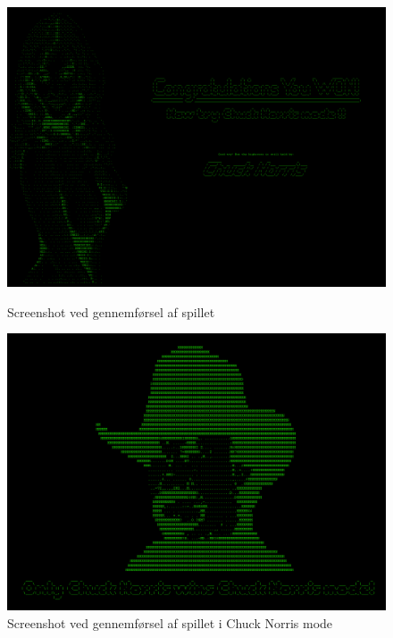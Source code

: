 \begin{figure}[h!]
\begin{minipage}[b]{0.49\textwidth}
\includegraphics[width=\linewidth]{figs/screenshots/won_normal.png}
\caption{Screenshot ved gennemførsel af spillet}
\label{fig:won_normal_2}
\end{minipage}\hfill
\begin{minipage}[b]{0.49\textwidth}
\includegraphics[width=\linewidth]{figs/screenshots/won_chuck_crop.png}
\caption{Screenshot ved gennemførsel af spillet i Chuck Norris mode}
\label{fig:won_chuck}
\end{minipage}\hfill
\end{figure}